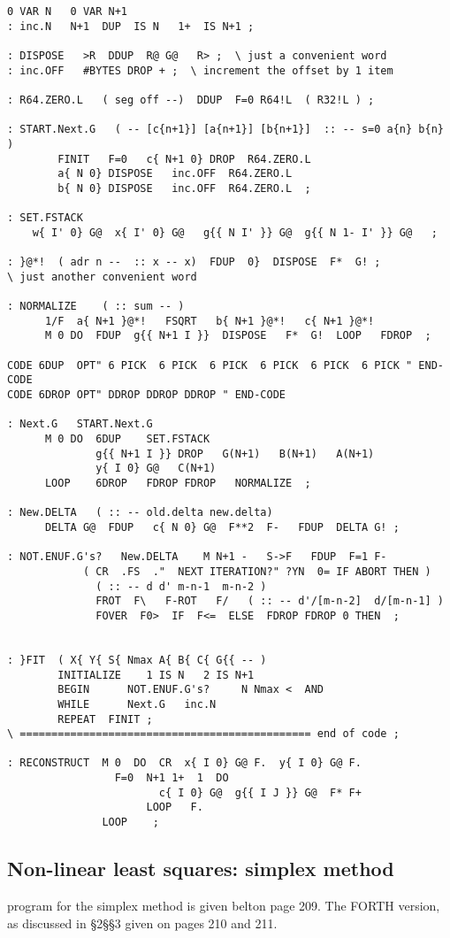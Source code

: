 \begin{lstlisting}
0 VAR N   0 VAR N+1
: inc.N   N+1  DUP  IS N   1+  IS N+1 ;

: DISPOSE   >R  DDUP  R@ G@   R> ;  \ just a convenient word
: inc.OFF   #BYTES DROP + ;  \ increment the offset by 1 item

: R64.ZERO.L   ( seg off --)  DDUP  F=0 R64!L  ( R32!L ) ;  

: START.Next.G   ( -- [c{n+1}] [a{n+1}] [b{n+1}]  :: -- s=0 a{n} b{n} )
        FINIT   F=0   c{ N+1 0} DROP  R64.ZERO.L
        a{ N 0} DISPOSE   inc.OFF  R64.ZERO.L
        b{ N 0} DISPOSE   inc.OFF  R64.ZERO.L  ;

: SET.FSTACK   
    w{ I' 0} G@  x{ I' 0} G@   g{{ N I' }} G@  g{{ N 1- I' }} G@   ;

: }@*!  ( adr n --  :: x -- x)  FDUP  0}  DISPOSE  F*  G! ;
\ just another convenient word

: NORMALIZE    ( :: sum -- )  
      1/F  a{ N+1 }@*!   FSQRT   b{ N+1 }@*!   c{ N+1 }@*!
      M 0 DO  FDUP  g{{ N+1 I }}  DISPOSE   F*  G!  LOOP   FDROP  ;

CODE 6DUP  OPT" 6 PICK  6 PICK  6 PICK  6 PICK  6 PICK  6 PICK " END-CODE
CODE 6DROP OPT" DDROP DDROP DDROP " END-CODE

: Next.G   START.Next.G 
      M 0 DO  6DUP    SET.FSTACK
              g{{ N+1 I }} DROP   G(N+1)   B(N+1)   A(N+1)
              y{ I 0} G@   C(N+1)
      LOOP    6DROP   FDROP FDROP   NORMALIZE  ;

: New.DELTA   ( :: -- old.delta new.delta)
      DELTA G@  FDUP   c{ N 0} G@  F**2  F-   FDUP  DELTA G! ;

: NOT.ENUF.G's?   New.DELTA    M N+1 -   S->F   FDUP  F=1 F- 
            ( CR  .FS  ."  NEXT ITERATION?" ?YN  0= IF ABORT THEN )
              ( :: -- d d' m-n-1  m-n-2 )  
              FROT  F\   F-ROT   F/   ( :: -- d'/[m-n-2]  d/[m-n-1] )
              FOVER  F0>  IF  F<=  ELSE  FDROP FDROP 0 THEN  ;


: }FIT  ( X{ Y{ S{ Nmax A{ B{ C{ G{{ -- )
        INITIALIZE    1 IS N   2 IS N+1
        BEGIN      NOT.ENUF.G's?     N Nmax <  AND 
        WHILE      Next.G   inc.N
        REPEAT  FINIT ;
\ ============================================== end of code ;

: RECONSTRUCT  M 0  DO  CR  x{ I 0} G@ F.  y{ I 0} G@ F. 
                 F=0  N+1 1+  1  DO 
                        c{ I 0} G@  g{{ I J }} G@  F* F+ 
                      LOOP   F. 
               LOOP    ;
\end{lstlisting}

\subsection{Non-linear least squares: simplex method}
 program for the simplex method is given belton page 209. The FORTH version, as discussed in \S2\S\S3 given on pages 210 and 211.

